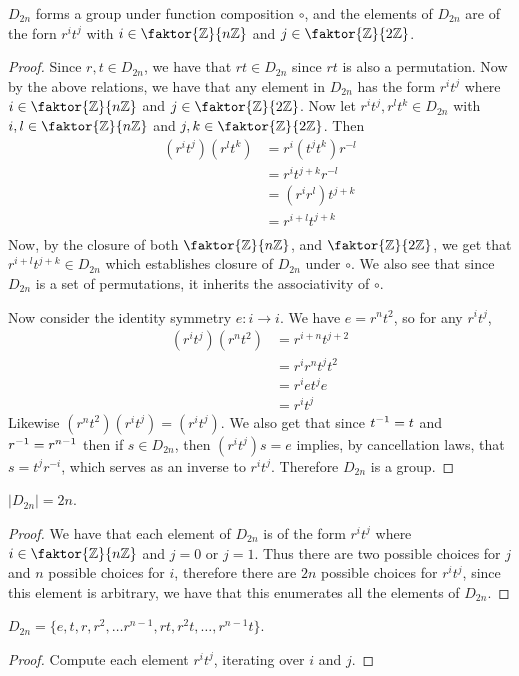 \begin{theorem}\label{theorem_1.2.2}
  $D_{2n}$ forms a group under function composition $\circ$, and the elements
  of $D_{2n}$ are of the forn $r^it^j$ with  $i \in \faktor{\Z}{n\Z}$ and $j
  \in \faktor{\Z}{2\Z}$.
\end{theorem}
\begin{proof}
  Since $r, t \in D_{2n}$, we have that $rt \in D_{2n}$ since $rt$ is also a
  permutation. Now by the above relations, we have that any element in
  $D_{2n}$ has the form $r^it^j$ where  $i \in \faktor{\Z}{n\Z}$ and $j \in
  \faktor{\Z}{2\Z}$. Now let $r^it^j, r^lt^k \in D_{2n}$ with $i,l \in
  \faktor{\Z}{n\Z}$ and $j,k \in \faktor{\Z}{2\Z}$. Then
  \begin{align*}
    (r^it^j)(r^lt^k)  &=  r^i(t^jt^k)r^{-l} \\
                      &=  r^it^{j+k}r^{-l}  \\
                      &=  (r^ir^l)t^{j+k} \\
                      &=  r^{i+l}t^{j+k}  \\
  \end{align*}
  Now, by the closure of both $\faktor{\Z}{n\Z}$, and
  $\faktor{\Z}{2\Z}$, we get that $r^{i+l}t^{j+k} \in D_{2n}$ which
  establishes closure of $D_{2n}$ under $\circ$. We also see that since
  $D_{2n}$ is a set of permutations, it inherits the associativity of $\circ$.

  Now consider the identity symmetry $e:i \rightarrow i$. We have $e=r^nt^2$,
  so for any  $r^it^j$,
  \begin{align*}
    (r^it^j)(r^nt^2)  &=  r^{i+n}t^{j+2}  \\
                      &=  r^ir^nt^jt^2  \\
                      &=  r^iet^je  \\
                      &=  r^it^j
  \end{align*}
  Likewise
  $(r^nt^2)(r^it^j)=(r^it^j)$. We also get that since $t^{-1}=t$ and
  $r^{-1}=r^{n-1}$ then if $s \in D_{2n}$, then $(r^it^j)s=e$ implies, by
  cancellation laws, that $s=t^jr^{-i}$, which serves as an inverse to
  $r^it^j$. Therefore  $D_{2n}$ is a group.
\end{proof}
\begin{corollary}
  $|D_{2n}|=2n$.
\end{corollary}
\begin{proof}
  We have that each element of $D_{2n}$ is of the form $r^it^j$ where $i \in
  \faktor{\Z}{n\Z}$ and $j=0$ or $j=1$. Thus there are two possible choices
  for $j$ and  $n$ possible choices for $i$, therefore there are  $2n$
  possible choices for  $r^it^j$, since this element is arbitrary, we have
  that this enumerates all the elements of  $D_{2n}$.
\end{proof}
\begin{corollary}
  $D_{2n}=\{e, t, r, r^2, \dots r^{n-1}, rt, r^2t, \dots, r^{n-1}t\}$.
\end{corollary}
\begin{proof}
  Compute each element  $r^it^j$, iterating over $i$ and  $j$.
\end{proof}

